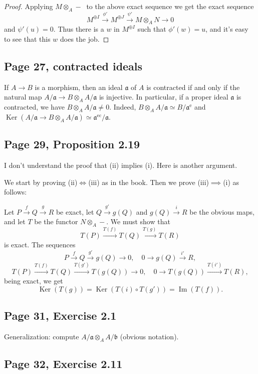 \documentclass[parskip=half,fontsize=12pt]{scrartcl}%
\newcommand{\oo}{\operatorname}\newcommand{\ooo}{\operatorname*}
\newcommand{\mf}{\mathfrak}
\newcommand{\aaa}{\mf a}
\newcommand{\bbb}{\mf b}
\newcommand{\Ker}{\operatorname{Ker}}\newcommand{\Coker}{\operatorname{Coker}}
\newcommand{\xr}{\xrightarrow}
\begin{document}
\begin{proof} 
Applying $M\otimes_A-\ $ to the above exact sequence we get the exact sequence 
$$
M^{\oplus I}\xrightarrow{\phi'}M^{\oplus J}\xrightarrow{\psi'}M\otimes_AN\to0
$$ 
and $\psi'(u)=0$. Thus there is a $w$ in $M^{\oplus I}$ such that $\phi'(w)=u$, and it's easy to see that this $w$ does the job. 
\end{proof}

\subsection{Page 27, contracted ideals}\label{27}%

If $A\to B$ is a morphism, then an ideal $\aaa$ of $A$ is contracted if and only if the natural map $A/\aaa\to B\otimes_A A/\aaa$ is injective. In particular, if a proper ideal $\aaa$ is contracted, we have $B\otimes_A A/\aaa\ne0$. Indeed, $B\otimes_A A/\aaa\simeq B/\aaa^{\oo e}$ and $\oo{Ker}(A/\aaa\to B\otimes_A A/\aaa)\simeq\aaa^{\oo{ec}}/\aaa$. %

\subsection{Page 29, Proposition 2.19}%

I don't understand the proof that (ii) implies (i). Here is another argument.

We start by proving (ii)$\iff$(iii) as in the book. Then we prove (iii)$\implies$(i) as follows:

Let $P\xr fQ\xr gR$ be exact, let $Q\xr{g'}g(Q)$ and $g(Q)\xr iR$ be the obvious maps, and let $T$ be the functor $N\otimes_A-$. We must show that 
$$
T(P)\xr{T(f)}T(Q)\xr{T(g)}T(R)
$$ 
is exact. The sequences 
$$
P\xr fQ\xr{g'}g(Q)\to0,\quad0\to g(Q)\xr{i'}R,
$$ 
$$
T(P)\xr{T(f)}T(Q)\xr{T(g')}T(g(Q))\to0,\quad0\to T(g(Q))\xr{T(i')}T(R),
$$ 
being exact, we get 
$$
\Ker(T(g))=\Ker(T(i)\circ T(g'))=\oo{Im}(T(f)).
$$

\subsection{Page 31, Exercise 2.1}%

Generalization: compute $A/\aaa\otimes_AA/\bbb$ (obvious notation).

\subsection{Page 32, Exercise 2.11}%
\end{document}
